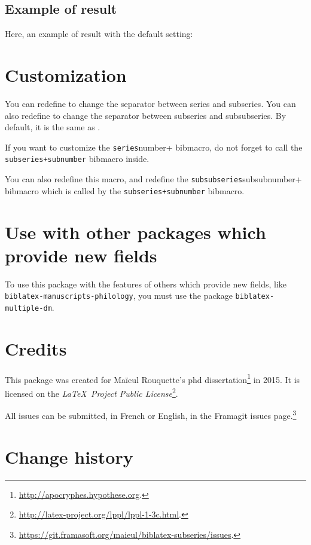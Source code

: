 \documentclass{ltxdockit}[2011/03/25]
\begin{document}
\subsection{Example of result}

Here, an example of result with the default setting:
\begin{quotation}
\cite{CSCO545}
\end{quotation}

\section{Customization}
You can redefine  to change the separator between series and subseries. You can also redefine  to change the separator between subseries and subsubseries. By default, it is the same as .

If you want to customize the \verb+series+number+ bibmacro, do not forget to call the \verb|subseries+subnumber| bibmacro inside. 

You can also redefine this macro, and redefine the \verb+subsubseries+subsubnumber+ bibmacro which is called by the \verb|subseries+subnumber| bibmacro.


\section{Use with other packages which provide new fields}

To use this package with the features of others which provide new fields, like \verb+biblatex-manuscripts-philology+, you must use the package \verb+biblatex-multiple-dm+.

\section{Credits}

This package was created for Maïeul Rouquette's phd dissertation\footnote{\url{http://apocryphes.hypothese.org}.} in 2015. It is licensed on the \emph{\LaTeX\ Project Public License}\footnote{\url{http://latex-project.org/lppl/lppl-1-3c.html}.}.


All issues can be submitted, in French or English, in the Framagit issues page.\footnote{\url{https://git.framasoft.org/maieul/biblatex-subseries/issues}.}

\section{Change history}
\end{document}
